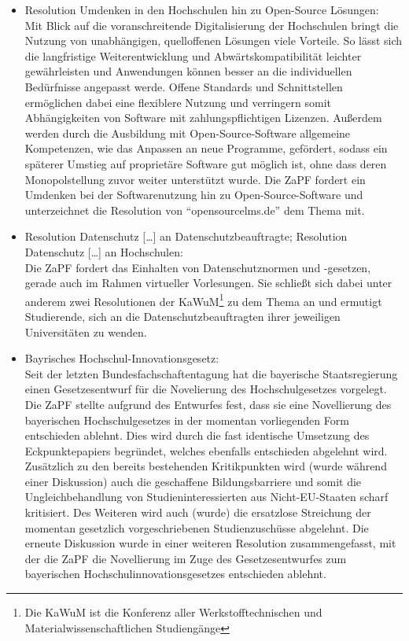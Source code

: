 \documentclass{scrartcl}
\begin{document}
\begin{itemize}
		\item Resolution Umdenken in den Hochschulen hin zu Open-Source Lösungen:\\
Mit Blick auf die voranschreitende Digitalisierung der Hochschulen bringt die Nutzung von unabhängigen, quelloffenen Lösungen viele Vorteile. So lässt sich die langfristige Weiterentwicklung und Abwärtskompatibilität leichter gewährleisten und Anwendungen können besser an die individuellen Bedürfnisse angepasst werde. Offene Standards und Schnittstellen ermöglichen dabei eine flexiblere Nutzung und verringern somit Abhängigkeiten von Software mit zahlungspflichtigen Lizenzen. Außerdem werden durch die Ausbildung mit Open-Source-Software allgemeine Kompetenzen, wie das Anpassen an neue Programme, gefördert, sodass ein späterer Umstieg auf proprietäre Software gut möglich ist, ohne dass deren Monopolstellung zuvor weiter unterstützt wurde. Die ZaPF fordert ein Umdenken bei der Softwarenutzung hin zu Open-Source-Software und unterzeichnet die Resolution von “opensourcelms.de” dem Thema mit.

		\item Resolution Datenschutz […] an Datenschutzbeauftragte; Resolution Datenschutz […] an Hochschulen:\\
Die ZaPF fordert das Einhalten von Datenschutznormen und -gesetzen, gerade auch im Rahmen virtueller Vorlesungen. Sie schließt sich dabei unter anderem zwei Resolutionen der KaWuM\footnote{Die KaWuM ist die Konferenz aller Werkstofftechnischen und Materialwissenschaftlichen Studiengänge} zu dem Thema an und ermutigt Studierende, sich an die Datenschutzbeauftragten ihrer jeweiligen Universitäten zu wenden.

		\item Bayrisches Hochschul-Innovationsgesetz:\\
Seit der letzten Bundesfachschaftentagung hat die bayerische Staatsregierung einen Gesetzesentwurf für die Novelierung des Hochschulgesetzes vorgelegt. Die ZaPF stellte aufgrund des Entwurfes fest, dass sie eine Novellierung des bayerischen Hochschulgesetzes in der momentan vorliegenden Form entschieden ablehnt. Dies wird durch die fast identische Umsetzung des Eckpunktepapiers begründet, welches ebenfalls entschieden abgelehnt wird. Zusätzlich zu den bereits bestehenden Kritikpunkten wird (wurde während einer Diskussion) auch die geschaffene Bildungsbarriere und somit die Ungleichbehandlung von Studieninteressierten aus Nicht-EU-Staaten scharf kritisiert. Des Weiteren wird auch (wurde) die ersatzlose Streichung der momentan gesetzlich vorgeschriebenen Studienzuschüsse abgelehnt. Die erneute Diskussion wurde in einer weiteren Resolution zusammengefasst, mit der die ZaPF die Novellierung im Zuge des Gesetzesentwurfes zum bayerischen Hochschulinnovationsgesetzes entschieden ablehnt.


\end{itemize}
\end{document}
